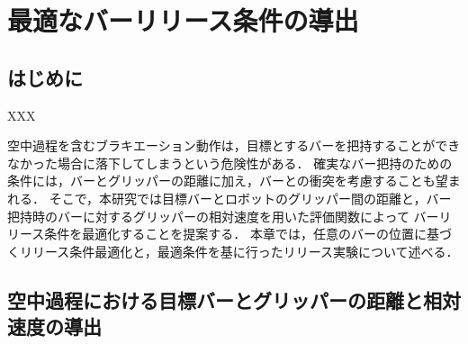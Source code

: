 \chapter[最適なバーリリース条件の導出]%
{最適なバーリリース条件の導出}
        \section{はじめに}
        XXX
        
        空中過程を含むブラキエーション動作は，目標とするバーを把持することができなかった場合に落下してしまうという危険性がある．
        確実なバー把持のための条件には，バーとグリッパーの距離に加え，バーとの衝突を考慮することも望まれる．
        そこで，本研究では目標バーとロボットのグリッパー間の距離と，バー把持時のバーに対するグリッパーの相対速度を用いた評価関数によって
        バーリリース条件を最適化することを提案する．
        本章では，任意のバーの位置に基づくリリース条件最適化と，最適条件を基に行ったリリース実験について述べる．

        \section{空中過程における目標バーとグリッパーの距離と相対速度の導出}

